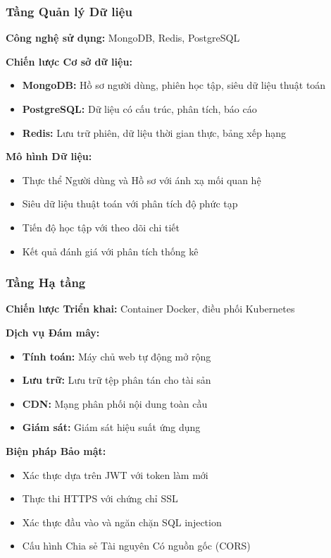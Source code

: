 \subsubsection{Tầng Quản lý Dữ liệu}
\textbf{Công nghệ sử dụng:} MongoDB, Redis, PostgreSQL

\textbf{Chiến lược Cơ sở dữ liệu:}
\begin{itemize}
    \item \textbf{MongoDB:} Hồ sơ người dùng, phiên học tập, siêu dữ liệu thuật toán
    \item \textbf{PostgreSQL:} Dữ liệu có cấu trúc, phân tích, báo cáo
    \item \textbf{Redis:} Lưu trữ phiên, dữ liệu thời gian thực, bảng xếp hạng
\end{itemize}

\textbf{Mô hình Dữ liệu:}
\begin{itemize}
    \item Thực thể Người dùng và Hồ sơ với ánh xạ mối quan hệ
    \item Siêu dữ liệu thuật toán với phân tích độ phức tạp
    \item Tiến độ học tập với theo dõi chi tiết
    \item Kết quả đánh giá với phân tích thống kê
\end{itemize}

\subsubsection{Tầng Hạ tầng}
\textbf{Chiến lược Triển khai:} Container Docker, điều phối Kubernetes

\textbf{Dịch vụ Đám mây:}
\begin{itemize}
    \item \textbf{Tính toán:} Máy chủ web tự động mở rộng
    \item \textbf{Lưu trữ:} Lưu trữ tệp phân tán cho tài sản
    \item \textbf{CDN:} Mạng phân phối nội dung toàn cầu
    \item \textbf{Giám sát:} Giám sát hiệu suất ứng dụng
\end{itemize}

\textbf{Biện pháp Bảo mật:}
\begin{itemize}
    \item Xác thực dựa trên JWT với token làm mới
    \item Thực thi HTTPS với chứng chỉ SSL
    \item Xác thực đầu vào và ngăn chặn SQL injection
    \item Cấu hình Chia sẻ Tài nguyên Có nguồn gốc (CORS)
\end{itemize}

